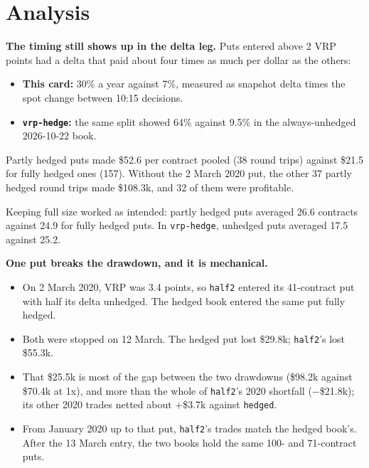 \documentclass{article}
\begin{document}
\section{Analysis}

\textbf{The timing still shows up in the delta leg.} Puts entered above 2 VRP points had a delta that paid about four times as much per dollar as the others:

\begin{itemize}

\item \textbf{This card:} 30\% a year against 7\%, measured as snapshot delta times the spot change between 10:15 decisions.

\item \textbf{\texttt{vrp-\allowbreak{}hedge}:} the same split showed 64\% against 9.5\% in the always-unhedged 2026-10-22 book.

\end{itemize}

Partly hedged puts made \$52.6 per contract pooled (38 round trips) against \$21.5 for fully hedged ones (157). Without the 2 March 2020 put, the other 37 partly hedged round trips made \$108.3k, and 32 of them were profitable.

Keeping full size worked as intended: partly hedged puts averaged 26.6 contracts against 24.9 for fully hedged puts. In \texttt{vrp-\allowbreak{}hedge}, unhedged puts averaged 17.5 against 25.2.

\textbf{One put breaks the drawdown, and it is mechanical.}

\begin{itemize}

\item On 2 March 2020, VRP was 3.4 points, so \texttt{half2} entered its 41-contract put with half its delta unhedged. The hedged book entered the same put fully hedged.

\item Both were stopped on 12 March. The hedged put lost \$29.8k; \texttt{half2}'s lost \$55.3k.

\item That \$25.5k is most of the gap between the two drawdowns (\$98.2k against \$70.4k at 1x), and more than the whole of \texttt{half2}'s 2020 shortfall (\ensuremath{-}\$21.8k); its other 2020 trades netted about +\$3.7k against \texttt{hedged}.

\item From January 2020 up to that put, \texttt{half2}'s trades match the hedged book's. After the 13 March entry, the two books hold the same 100- and 71-contract puts.

\end{itemize}
\end{document}
